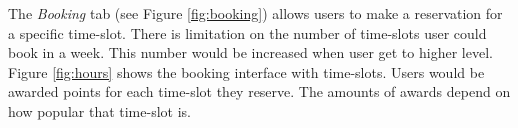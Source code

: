 The \emph{Booking} tab (see Figure \ref{fig:booking}) allows users to make a reservation for a specific time-slot. There is limitation on the number of time-slots user could book in a week. This number would be increased when user get to higher level. Figure \ref{fig:hours} shows the booking interface with time-slots. Users would be awarded points for each time-slot they reserve. The amounts of awards depend on how popular that time-slot is.
\begin{figure}%
    \centering

\end{figure}
